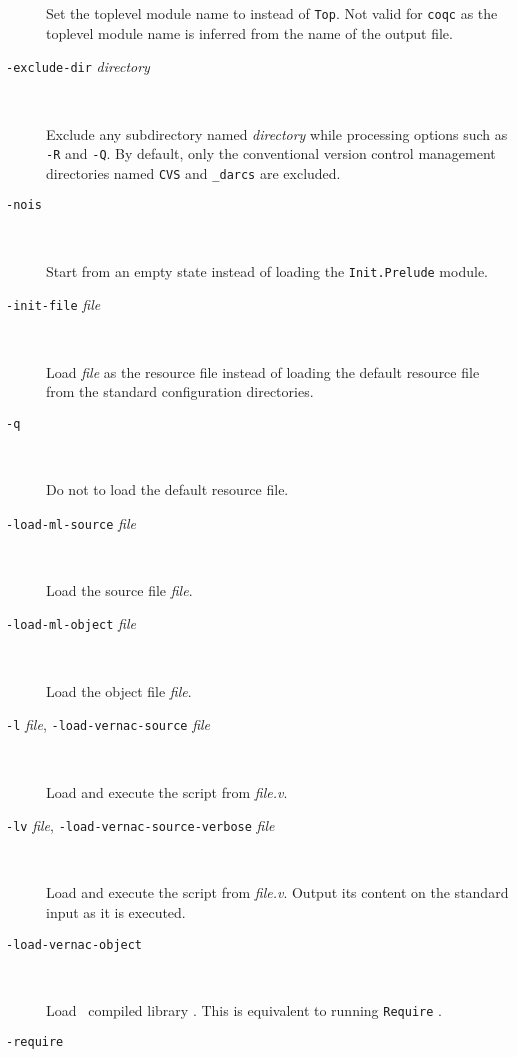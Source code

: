 \begin{description}
  Set the toplevel module name to {\dirpath} instead of {\tt Top}. Not
  valid for {\tt coqc} as the toplevel module name is inferred from the
  name of the output file.

\item[{\tt -exclude-dir} {\em directory}]\ %

  Exclude any subdirectory named {\em directory} while
  processing options such as {\tt -R} and {\tt -Q}. By default, only the
  conventional version control management directories named {\tt CVS} and
  {\tt \_darcs} are excluded.

\item[{\tt -nois}]\ %

  Start from an empty state instead of loading the {\tt Init.Prelude}
  module.

\item[{\tt -init-file} {\em file}]\ %

  Load {\em file} as the resource file instead of loading the default
  resource file from the standard configuration directories.

\item[{\tt -q}]\ %

  Do not to load the default resource file.

\item[{\tt -load-ml-source} {\em file}]\ %

  Load the {\ocaml} source file {\em file}.

\item[{\tt -load-ml-object} {\em file}]\ %

  Load the {\ocaml} object file {\em file}.

\item[{\tt -l} {\em file}, {\tt -load-vernac-source} {\em file}]\ %

  Load and execute the {\Coq} script from {\em file.v}.

\item[{\tt -lv} {\em file}, {\tt -load-vernac-source-verbose} {\em
    file}]\ %

  Load and execute the {\Coq} script from {\em file.v}.
  Output its content on the standard input as it is executed.

\item[{\tt -load-vernac-object} {\dirpath}]\ %

  Load \Coq~compiled library {\dirpath}. This is equivalent to running
  {\tt Require} {\dirpath}.

\item[{\tt -require} {\dirpath}]\ %


\end{description}
